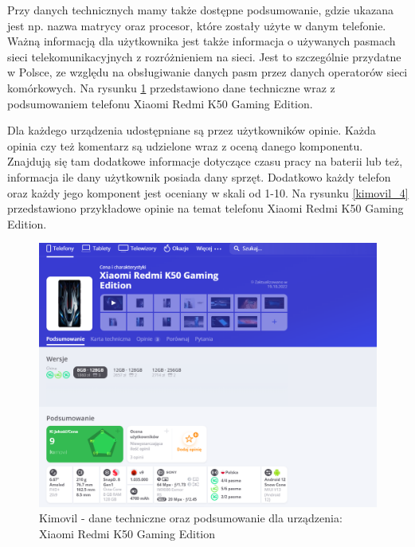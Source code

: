 Przy danych technicznych mamy także dostępne podsumowanie, gdzie ukazana jest np. nazwa matrycy oraz procesor, które zostały użyte w danym telefonie. Ważną informacją dla użytkownika jest także informacja o używanych pasmach sieci telekomunikacyjnych z rozróżnieniem na sieci. Jest to szczególnie przydatne w Polsce, ze względu na obsługiwanie danych pasm przez danych operatorów sieci komórkowych. Na rysunku \ref*{kimovil_3} przedstawiono dane techniczne wraz z podsumowaniem telefonu Xiaomi Redmi K50 Gaming Edition.

Dla każdego urządzenia udostępniane są przez użytkowników opinie. Każda opinia czy też komentarz są udzielone wraz z oceną danego komponentu. Znajdują się tam dodatkowe informacje dotyczące czasu pracy na baterii lub też, informacja ile dany użytkownik posiada dany sprzęt. Dodatkowo każdy telefon oraz każdy jego komponent jest oceniany w skali od 1-10. Na rysunku \ref*{kimovil_4} przedstawiono przykładowe opinie na temat telefonu Xiaomi Redmi K50 Gaming Edition.
\begin{figure}[h]
    \centering
    \includegraphics[scale=0.45]{img/Kimovil/kimovilDetails.png}
    \caption{Kimovil - dane techniczne oraz podsumowanie dla urządzenia: Xiaomi Redmi K50 Gaming Edition}
    \label{kimovil_3}
\end{figure}
